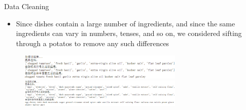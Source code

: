 \documentclass[
 size=14pt,
 paper=smartboard,  %
 mode=present, 		%
 display=slides, 	%
 style=tuliplab,  	%
 pauseslide,
 fleqn,leqno]{powerdot}
\begin{document}
\begin{slide}{Data Cleaning}
  \begin{center}
  
  {
  \begin{itemize}
  \item 
  Since dishes contain a large number of ingredients, and since the same ingredients can vary in numbers, tenses, and so on, we considered sifting through a potatos to remove any such differences
  \end{itemize}
  }
  \begin{figure}
    \centering
    \begin{minipage}[t]{1\textwidth}
    \centering
    \includegraphics[width=0.7\textwidth]{pic01/clean1.eps} 
   
    \end{minipage}
    \begin{minipage}[t]{1\textwidth}
    \centering
    \includegraphics[width=0.7\textwidth]{pic01/clean2.eps}
   
    \end{minipage}
  \end{figure}   
    

  \end{center}
  \bigskip
  \begin{center}
  
  \end{center}
  \bigskip
  
  
  
  \end{slide}
\end{document}
